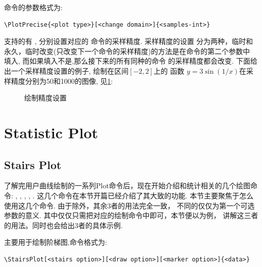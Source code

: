 \cmd{\PlotPrecise}\index{\cmd{\PlotPrecise}}命令的参数格式为:
\begin{verbatim}
\PlotPrecise{<plot type>}[<change domain>]{<samples-int>}
\end{verbatim}

支持的有 , 分别设置对应的
命令\cmd{\Plot, \ParamPlot, \ContourPlot, \PolarPlot}的采样精度. 采样精度的设置
分为两种，临时和永久，临时改变(只改变下一个命令的采样精度)的方法是在命令的第二个参数中
填入\cmd{[once]}, 而如果填入不是,那么接下来的所有同种的命令
的采样精度都会改变. 下面给出一个采样精度设置的例子, 绘制在区间$[-2, 2]$上的
函数 $y=3\sin(1/x)$在采样精度分别为50和1000的图像, 见\cref{fig:plot-precise}:

\begin{figure}[!htb]
    \centering
    \;
    \caption{绘制精度设置}
    \label{fig:plot-precise}
\end{figure}


\section{Statistic Plot}
\subsection{Stairs Plot}
了解完用户曲线绘制的一系列Plot命令后，现在开始介绍和统计相关的几个绘图命令:
\cmd{\ListPlot}\index{\cmd{\ListPlot}}, \cmd{\StairsPlot}\index{\cmd{\StairsPlot}}, 
\cmd{\StemPlot}\index{\cmd{\StemPlot}}, \cmd{\BarPlot}\index{\cmd{\BarPlot}}, \cmd{\ShadePlot}\index{\cmd{\ShadePlot}}.
这几个命令在本节开篇已经介绍了其大致的功能. 本节主要聚焦于怎么使用这几个命令. 由于除\cmd{\ShadePlot,\ListPlot}外，其余3者的用法完全一致，
不同的仅仅为第一个可选参数的意义. 其中\cmd{\ListPlot}仅仅只需把对应的绘制命令中即可，本节便以\cmd{\StairsPlot}为例，
讲解这三者的用法。同时也会给出3者的具体示例.

\cmd{\StairsPlot}主要用于绘制阶梯图,命令格式为:
\begin{verbatim}
\StairsPlot[<stairs option>][<draw option>][<marker option>]{<data>}
\end{verbatim}

